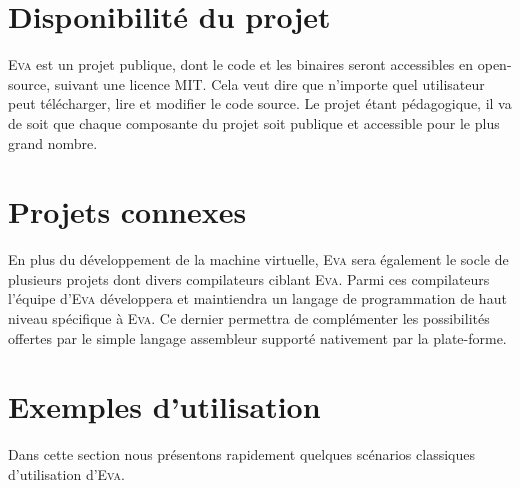 \documentclass[11pt]{article}
\newcommand{\noun}[1]{\textsc{#1}}
\begin{document}
\section{Disponibilité du projet}

\noun{Eva} est un projet publique, dont le code et les binaires seront
accessibles en open-source, suivant une licence MIT. Cela veut dire
que n'importe quel utilisateur peut télécharger, lire et modifier
le code source. Le projet étant pédagogique, il va de soit que chaque
composante du projet soit publique et accessible pour le plus grand nombre.

\section{Projets connexes}

En plus du développement de la machine virtuelle, \noun{Eva} sera
également le socle de plusieurs projets dont divers compilateurs ciblant
\noun{Eva}. Parmi ces compilateurs l'équipe d'\noun{Eva} développera et maintiendra
un langage de programmation de haut niveau spécifique à \noun{Eva}. Ce dernier
permettra de complémenter les possibilités offertes par le simple langage
assembleur supporté nativement par la plate-forme.

\section{Exemples d’utilisation}

Dans cette section nous présentons rapidement quelques scénarios classiques d'utilisation d'\noun{Eva}.
\end{document}
